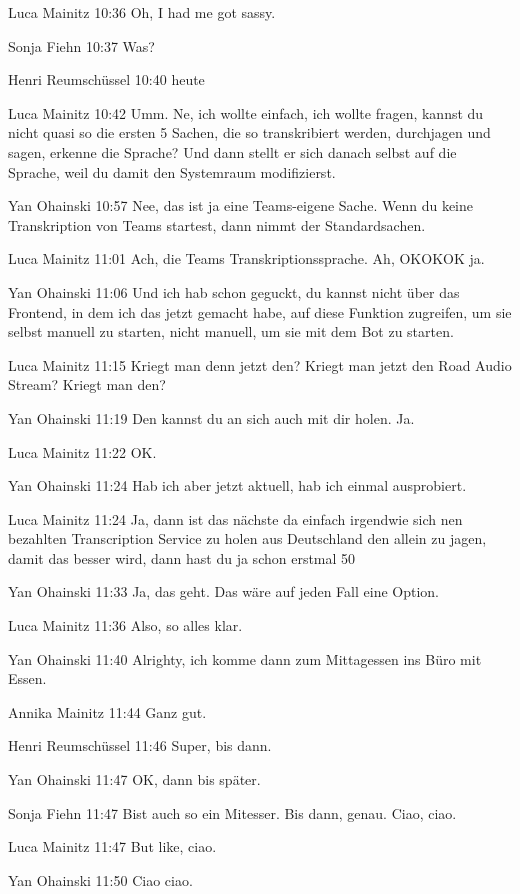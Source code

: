 Luca Mainitz   10:36
Oh, I had me got sassy.

Sonja Fiehn   10:37
Was?

Henri Reumschüssel   10:40
heute

Luca Mainitz   10:42
Umm.
Ne, ich wollte einfach, ich wollte fragen, kannst du nicht quasi so die ersten 5 Sachen, die so transkribiert werden, durchjagen und sagen, erkenne die Sprache? Und dann stellt er sich danach selbst auf die Sprache, weil du damit den Systemraum modifizierst.

Yan Ohainski   10:57
Nee, das ist ja eine Teams-eigene Sache. Wenn du keine Transkription von Teams startest, dann nimmt der Standardsachen.

Luca Mainitz   11:01
Ach, die Teams Transkriptionssprache.
Ah, OKOKOK ja.

Yan Ohainski   11:06
Und ich hab schon geguckt, du kannst nicht über das Frontend, in dem ich das jetzt gemacht habe, auf diese Funktion zugreifen, um sie selbst manuell zu starten, nicht manuell, um sie mit dem Bot zu starten.

Luca Mainitz   11:15
Kriegt man denn jetzt den? Kriegt man jetzt den Road Audio Stream? Kriegt man den?

Yan Ohainski   11:19
Den kannst du an sich auch mit dir holen.
Ja.

Luca Mainitz   11:22
OK.

Yan Ohainski   11:24
Hab ich aber jetzt aktuell, hab ich einmal ausprobiert.

Luca Mainitz   11:24
Ja, dann ist das nächste da einfach irgendwie sich nen bezahlten Transcription Service zu holen aus Deutschland den allein zu jagen, damit das besser wird, dann hast du ja schon erstmal 50%

Yan Ohainski   11:33
Ja, das geht. Das wäre auf jeden Fall eine Option.

Luca Mainitz   11:36
Also, so alles klar.

Yan Ohainski   11:40
Alrighty, ich komme dann zum Mittagessen ins Büro mit Essen.

Annika Mainitz   11:44
Ganz gut.

Henri Reumschüssel   11:46
Super, bis dann.

Yan Ohainski   11:47
OK, dann bis später.

Sonja Fiehn   11:47
Bist auch so ein Mitesser. Bis dann, genau. Ciao, ciao.

Luca Mainitz   11:47
But like, ciao.

Yan Ohainski   11:50
Ciao ciao.

